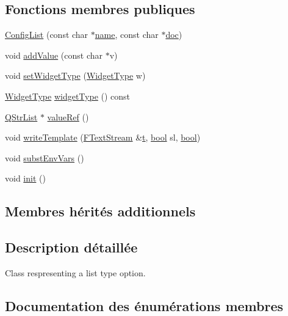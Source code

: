 \subsection*{Fonctions membres publiques}
\begin{DoxyCompactItemize}
\item 
\hyperlink{class_config_list_aae0b9ca88cb622aec4b31270c1c1f944}{Config\+List} (const char $\ast$\hyperlink{class_config_option_a2f226c32b0c447c1fa628660f42859c4}{name}, const char $\ast$\hyperlink{vhdljjparser_8cpp_a9910424bf5401d657c3b3fdff6fcc152}{doc})
\item 
void \hyperlink{class_config_list_a708f7e2019c42d2d1d8957ee33b94518}{add\+Value} (const char $\ast$v)
\item 
void \hyperlink{class_config_list_a0e85c4f20ca576934f53e7d6a9361896}{set\+Widget\+Type} (\hyperlink{class_config_list_a562e3dbe5fc70f1af7ed4e748dae0ae9}{Widget\+Type} w)
\item 
\hyperlink{class_config_list_a562e3dbe5fc70f1af7ed4e748dae0ae9}{Widget\+Type} \hyperlink{class_config_list_a33c5b11faa9fdb5127ffa0e101008ab0}{widget\+Type} () const 
\item 
\hyperlink{class_q_str_list}{Q\+Str\+List} $\ast$ \hyperlink{class_config_list_aebf1360b92b390ff0ec638684ac0ef9b}{value\+Ref} ()
\item 
void \hyperlink{class_config_list_abd14c6ac16fd90f2e501ab10bb61344f}{write\+Template} (\hyperlink{class_f_text_stream}{F\+Text\+Stream} \&\hyperlink{058__bracket__recursion_8tcl_a69e959f6901827e4d8271aeaa5fba0fc}{t}, \hyperlink{qglobal_8h_a1062901a7428fdd9c7f180f5e01ea056}{bool} sl, \hyperlink{qglobal_8h_a1062901a7428fdd9c7f180f5e01ea056}{bool})
\item 
void \hyperlink{class_config_list_a46cdc3f64d1799a802fb2d00af2e3f65}{subst\+Env\+Vars} ()
\item 
void \hyperlink{class_config_list_a48019d23edc37549f47d41ce41c43298}{init} ()
\end{DoxyCompactItemize}
\subsection*{Membres hérités additionnels}


\subsection{Description détaillée}
Class respresenting a list type option. 

\subsection{Documentation des énumérations membres}
\hypertarget{class_config_list_a562e3dbe5fc70f1af7ed4e748dae0ae9}{}
